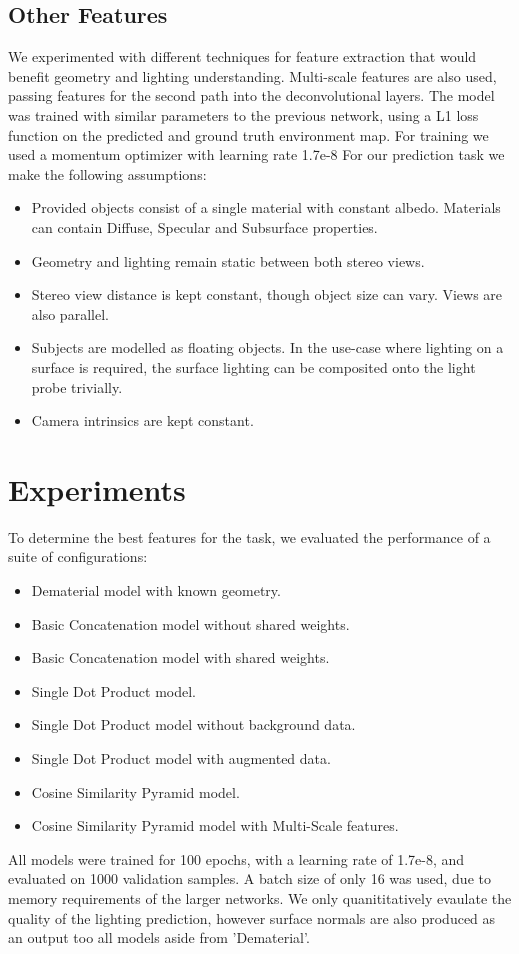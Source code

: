 \documentclass[ %
                    author={Gavin Parker},
                supervisor={Dr. Neill Campbell},
                    degree={MEng},
                     title={Deep Siamese Networks for Illumination Estimation from Stereo Images},
                  subtitle={},
                      type={research},
                      year={2018} ]{dissertation}
\begin{document}
\subsection{Other Features}
We experimented with different techniques for feature extraction that would benefit geometry and lighting understanding. Multi-scale features are also used, passing features for the second path into the deconvolutional layers. The model was trained with similar parameters to the previous network, using a L1 loss function on the predicted and ground truth environment map. For training we used a momentum optimizer with learning rate 1.7e-8
\newline
{}
For our prediction task we make the following assumptions:
\begin{itemize}
\item Provided objects consist of a single material with constant albedo. Materials can contain Diffuse, Specular and Subsurface properties.
\item Geometry and lighting remain static between both stereo views.
\item Stereo view distance is kept constant, though object size can vary. Views are also parallel.
\item Subjects are modelled as floating objects. In the use-case where lighting on a surface is required, the surface lighting can be composited onto the light probe trivially.
\item Camera intrinsics are kept constant.
\end{itemize}

\section{Experiments}
To determine the best features for the task, we evaluated the performance of a suite of configurations:
\begin{itemize}
\item Dematerial model with known geometry.
\item Basic Concatenation model without shared weights.
\item Basic Concatenation model with shared weights.
\item Single Dot Product model.
\item Single Dot Product model without background data.
\item Single Dot Product model with augmented data.
\item Cosine Similarity Pyramid model.
\item Cosine Similarity Pyramid model with Multi-Scale features.
\end{itemize}
All models were trained for 100 epochs, with a learning rate of 1.7e-8, and evaluated on 1000 validation samples. A batch size of only 16 was used, due to memory requirements of the larger networks. We only quanititatively evaulate the quality of the lighting prediction, however surface normals are also produced as an output too all models aside from 'Dematerial'.
\end{document}
